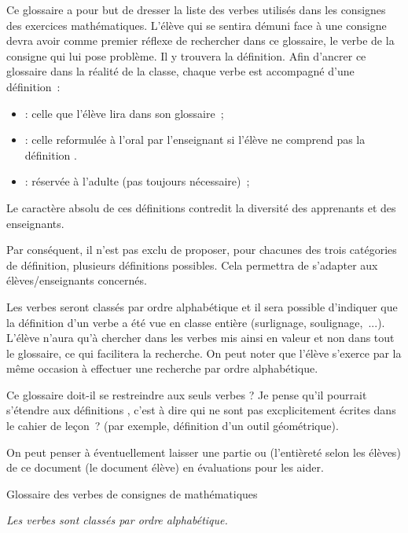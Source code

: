 \documentclass{article}
\begin{document}
    Ce glossaire a pour but de dresser la liste des verbes utilisés dans les consignes
    des exercices mathématiques. L'élève qui se sentira démuni face à une consigne
    devra avoir comme premier réflexe de rechercher dans ce glossaire, le verbe de
    la consigne qui lui pose problème. Il y trouvera la définition.
    Afin d'ancrer ce glossaire dans la réalité de la classe, chaque verbe est
    accompagné d'une définition~:
    \begin{itemize}
        \item {} : celle que l'élève lira dans son glossaire~;
        \item {} : celle reformulée à l'oral par l'enseignant si l'élève ne
        comprend pas la définition .
        \item  {}: réservée à l'adulte (pas toujours nécessaire)~;
    \end{itemize}

    Le caractère absolu de ces définitions contredit la diversité des apprenants et
    des enseignants.

    Par conséquent, il n'est pas exclu de proposer, pour chacunes des trois catégories
    de définition, plusieurs définitions possibles. Cela permettra de s'adapter aux
    élèves/enseignants concernés.

    Les verbes seront classés par ordre alphabétique et il sera possible d'indiquer
    que la définition d'un verbe a été vue en classe entière (surlignage, soulignage,~...).
    L'élève n'aura qu'à chercher dans les verbes mis ainsi en valeur et non dans tout
    le glossaire, ce qui facilitera la recherche. On peut noter que l'élève s'exerce
    par la même occasion à effectuer une recherche par ordre alphabétique.

    Ce glossaire doit-il se restreindre aux seuls verbes ? Je pense qu'il pourrait
    s'étendre aux définitions , c'est à dire qui ne sont
    pas excplicitement écrites dans le cahier de leçon~? (par exemple, définition
    d'un outil géométrique).

    On peut penser à éventuellement laisser une partie ou (l'entièreté selon les élèves)
    de ce document (le document élève) en évaluations pour les aider.
    
    \newpage
    \begin{center}\LARGE
        Glossaire des verbes de consignes de mathématiques
    \end{center}
    \noindent\textit{Les verbes sont classés par ordre alphabétique.}
    \par\vskip10pt
    
\end{document}
